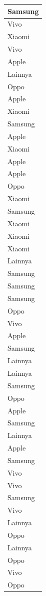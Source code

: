 \documentclass[
  letterpaper,
  DIV=11,
  numbers=noendperiod]{scrartcl}
\begin{document}
\begin{table}
\begin{tabular}[t]{l}
\hline
Samsung\\
\hline
Vivo\\
\hline
Xiaomi\\
\hline
Vivo\\
\hline
Apple\\
\hline
Lainnya\\
\hline
Oppo\\
\hline
Apple\\
\hline
Xiaomi\\
\hline
Samsung\\
\hline
Apple\\
\hline
Xiaomi\\
\hline
Apple\\
\hline
Apple\\
\hline
Oppo\\
\hline
Xiaomi\\
\hline
Samsung\\
\hline
Xiaomi\\
\hline
Xiaomi\\
\hline
Xiaomi\\
\hline
Lainnya\\
\hline
Samsung\\
\hline
Samsung\\
\hline
Samsung\\
\hline
Oppo\\
\hline
Vivo\\
\hline
Apple\\
\hline
Samsung\\
\hline
Lainnya\\
\hline
Lainnya\\
\hline
Samsung\\
\hline
Oppo\\
\hline
Apple\\
\hline
Samsung\\
\hline
Lainnya\\
\hline
Apple\\
\hline
Samsung\\
\hline
Vivo\\
\hline
Vivo\\
\hline
Samsung\\
\hline
Vivo\\
\hline
Lainnya\\
\hline
Oppo\\
\hline
Lainnya\\
\hline
Oppo\\
\hline
Vivo\\
\hline
Oppo\\

\end{tabular}
\end{table}
\end{document}
